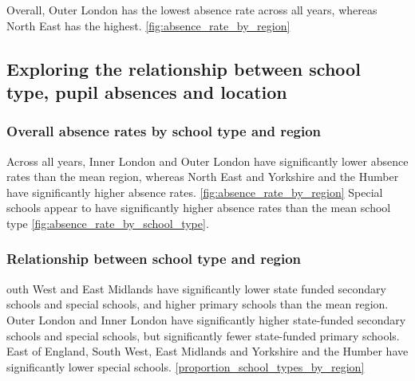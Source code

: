 \documentclass{article}
\begin{document}
        Overall, Outer London has the lowest absence rate across all years, whereas North East has the highest. \ref{fig:absence_rate_by_region}

    \subsection*{Exploring the relationship between school type, pupil absences and location}
        \subsubsection*{Overall absence rates by school type and region}
        Across all years, Inner London and Outer London have significantly lower absence rates than the mean region, whereas North East and Yorkshire and the Humber have significantly higher absence rates. \ref{fig:absence_rate_by_region} Special schools appear to have significantly higher absence rates than the mean school type \ref{fig:absence_rate_by_school_type}.
    
        \subsubsection*{Relationship between school type and region} 
    outh West and East Midlands have significantly lower state funded secondary schools and special schools, and higher primary schools than the mean region. Outer London and Inner London have significantly higher state-funded secondary schools and special schools, but significantly fewer state-funded primary schools. East of England, South West, East Midlands and Yorkshire and the Humber have significantly lower special schools. \ref{proportion_school_types_by_region}
    
\end{document}
